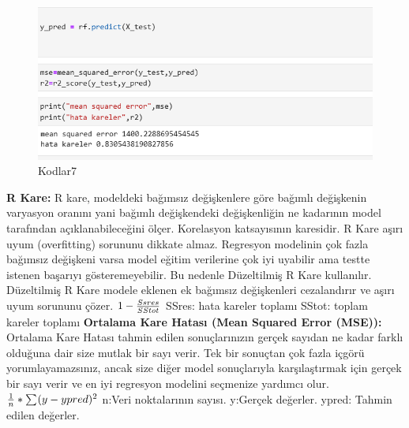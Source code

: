 \documentclass[12pt, a4paper]{article}
\begin{document}
\begin{figure}[!htbp] 
	\caption{Kodlar7}
	\centering
	\includegraphics[angle=0, width=\textwidth]{11.0.png} 
	
\end{figure}
\textbf{R Kare:} R kare, modeldeki bağımsız değişkenlere göre bağımlı değişkenin varyasyon oranını yani bağımlı değişkendeki değişkenliğin ne kadarının model tarafından açıklanabileceğini ölçer. Korelasyon katsayısının karesidir. R Kare aşırı uyum (overfitting) sorununu dikkate almaz. Regresyon modelinin çok fazla bağımsız değişkeni varsa model eğitim verilerine çok iyi uyabilir ama testte istenen başarıyı gösteremeyebilir. Bu nedenle Düzeltilmiş R Kare kullanılır. Düzeltilmiş R Kare modele eklenen ek bağımsız değişkenleri cezalandırır ve aşırı uyum sorununu çözer.\newline
\begin{math} 
	\centering	\newline 1-\frac{Ssres}{SStot} 
\end{math}\newline
SSres: hata kareler toplamı\newline
SStot: toplam kareler toplamı\newline
\textbf{Ortalama Kare Hatası (Mean Squared Error (MSE)):} Ortalama Kare Hatası tahmin edilen sonuçlarınızın gerçek sayıdan ne kadar farklı olduğuna dair size mutlak bir sayı verir. Tek bir sonuçtan çok fazla içgörü yorumlayamazsınız, ancak size diğer model sonuçlarıyla karşılaştırmak için gerçek bir sayı verir ve en iyi regresyon modelini seçmenize yardımcı olur. \cite{site11}
\begin{math} 
	\centering	\newline \frac{1}{n} * \sum_{}^{}(y-ypred)^2
\end{math}	
\newline n:Veri noktalarının sayısı.
\newline y:Gerçek değerler.
\newline ypred: Tahmin edilen değerler.
\end{document}
